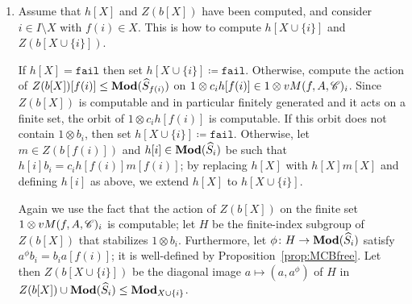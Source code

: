 \documentclass{amsart}
\begin{document}
\begin{algo}
\begin{enumerate}
    After all $h[X]$ and $Z(b[X])$ have been computed, we will in
    particular know whether $b$ and $c$ are conjugate: if
    $h[I]\neq\texttt{fail}$, then it conjugates $b$ into $c$. The
    centralizer of $b$ in $Z(b[I])$.
  \item Assume that $h[X]$ and $Z(b[X])$ have been computed, and
    consider $i\in I\setminus X$ with $f(i)\in X$. This is how to
    compute $h[X\cup\{i\}]$ and $Z(b[X\cup\{i\}])$.

    If $h[X]=\texttt{fail}$ then set
    $h[X\cup\{i\}]\coloneqq\texttt{fail}$. Otherwise, compute the
    action of $Z(b[X])[f(i)]\le\mathbf{\relax Mod}(\widehat S_{f(i)})$ on
    $1\otimes c_i h[f(i)]\in 1\otimes vM(f,A,{\mathscr C})_i$. Since $Z(b[X])$
    is computable and in particular finitely generated and it acts on
    a finite set, the orbit of $1\otimes c_i h[f(i)]$ is
    computable. If this orbit does not contain $1\otimes b_i$, then
    set $h[X\cup\{i\}]\coloneqq\texttt{fail}$. Otherwise, let
    $m\in Z(b[f(i)])$ and $h[i]\in\mathbf{\relax Mod}(\widehat S_i)$ be such that
    $h[i]b_i=c_i h[f(i)]m[f(i)]$; by replacing $h[X]$ with $h[X]m[X]$
    and defining $h[i]$ as above, we extend $h[X]$ to $h[X\cup\{i\}]$.

    Again we use the fact that the action of $Z(b[X])$ on the finite
    set $1\otimes vM(f,A,{\mathscr C})_i$ is computable; let $H$ be the
    finite-index subgroup of $Z(b[X])$ that stabilizes $1\otimes
    b_i$.
    Furthermore, let $\phi\colon H\to\mathbf{\relax Mod}(\widehat S_i)$ satisfy
    $a^\phi b_i=b_i a[f(i)]$; it is well-defined by
    Proposition~\ref{prop:MCBfree}. Let then $Z(b[X\cup\{i\}])$ be the
    diagonal image $a\mapsto(a,a^\phi)$ of $H$ in
    $Z(b[X])\cup\mathbf{\relax Mod}(\widehat S_i)\le \mathbf{\relax Mod}_{X\cup\{i\}}$.
  \end{enumerate}
\end{algo}
\end{document}
